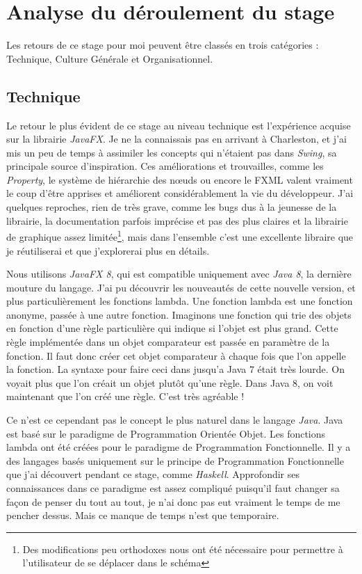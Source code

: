 ﻿\chapter{Analyse du déroulement du stage}
Les retours de ce stage pour moi peuvent être classés en trois catégories : Technique, Culture Générale et Organisationnel.

\section{Technique}
Le retour le plus évident de ce stage au niveau technique est l'expérience acquise sur la librairie \textit{JavaFX}. Je ne la connaissais pas en arrivant à Charleston, et j'ai mis un peu de temps à assimiler les concepts qui n'étaient pas dans \textit{Swing}, sa principale source d'inspiration. Ces améliorations et trouvailles, comme les \textit{Property}, le système de hiérarchie des nœuds ou encore le FXML valent vraiment le coup d'être apprises et améliorent considérablement la vie du développeur. J'ai quelques reproches, rien de très grave, comme les bugs dus à la jeunesse de la librairie, la documentation parfois imprécise et pas des plus claires et la librairie de graphique assez limitée\footnote{Des modifications peu orthodoxes nous ont été nécessaire pour permettre à l'utilisateur de se déplacer dans le schéma}, mais dans l'ensemble c'est une excellente libraire que je réutiliserai et que j'explorerai plus en détails.

Nous utilisons \textit{JavaFX 8}, qui est compatible uniquement avec \textit{Java 8}, la dernière mouture du langage. J'ai pu découvrir les nouveautés de cette nouvelle version, et plus particulièrement les fonctions lambda. Une fonction lambda est une fonction anonyme, passée à une autre fonction. Imaginons une fonction qui trie des objets en fonction d'une règle particulière qui indique si l'objet est plus grand. Cette règle implémentée dans un objet comparateur est passée en paramètre de la fonction. Il faut donc créer cet objet comparateur à chaque fois que l'on appelle la fonction. La syntaxe pour faire ceci dans jusqu'a Java 7 était très lourde. On voyait plus que l'on créait un objet plutôt qu'une règle. Dans Java 8, on voit maintenant que l'on créé une règle. C'est très agréable !

Ce n'est ce cependant pas le concept le plus naturel dans le langage \textit{Java}. Java est basé sur le paradigme de Programmation Orientée Objet. Les fonctions lambda ont été créées pour le paradigme de Programmation Fonctionnelle. Il y a des langages basés uniquement sur le principe de Programmation Fonctionnelle que j'ai découvert pendant ce stage, comme \textit{Haskell}. Approfondir ses connaissances dans ce paradigme est assez compliqué puisqu'il faut changer sa façon de penser du tout au tout, je n'ai donc pas eut vraiment le temps de me pencher dessus. Mais ce manque de temps n'est que temporaire.

